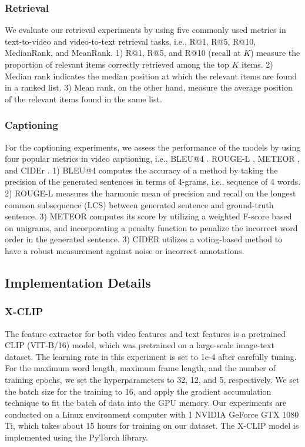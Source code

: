 \documentclass{article}
\begin{document}
\subsubsection{Retrieval}
We evaluate our retrieval experiments by using five commonly used metrics in text-to-video and video-to-text retrieval tasks, i.e., R@1, R@5, R@10, MedianRank, and MeanRank. 1) R@1, R@5, and R@10 (recall at $K$) measure the proportion of relevant items correctly retrieved among the top $K$ items. 2) Median rank indicates the median position at which the relevant items are found in a ranked list. 3) Mean rank, on the other hand, measure the average position of the relevant items found in the same list.

\subsubsection{Captioning}
For the captioning experiments, we assess the performance of the models by using four popular metrics in video captioning, i.e., BLEU@4 \cite{10.3115/1073083.1073135}. ROUGE-L \cite{lin2004rouge}, METEOR \cite{banarjee2005}, and CIDEr \cite{7299087}. 1) BLEU@4 computes the accuracy of a method by taking the precision of the generated sentences in terms of 4-grams, i.e., sequence of 4 words. 2) ROUGE-L measures the harmonic mean of precision and recall on the longest common subsequence (LCS) between generated sentence and ground-truth sentence.  3) METEOR computes its score by utilizing a weighted F-score based on unigrams, and incorporating a penalty function to penalize the incorrect word order in the generated sentence. 3) CIDER utilizes a voting-based method to have a robust measurement against noise or incorrect annotations.


\subsection{Implementation Details}
\subsubsection{X-CLIP}
The feature extractor for both video features and text features is a pretrained CLIP (VIT-B/16) \cite{Radford2021LearningTV} model, which was pretrained on a large-scale image-text dataset. The learning rate in this experiment is set to 1e-4 after carefully tuning. For the maximum word length, maximum frame length, and the number of training epochs, we set the hyperparameters to 32, 12, and 5, respectively. We set the batch size for the training to 16, and apply the gradient accumulation technique to fit the batch of data into the GPU memory. Our experiments are conducted on a Linux environment computer with 1 NVIDIA GeForce GTX 1080 Ti, which takes about 15 hours for training on our dataset. The X-CLIP model is implemented using the PyTorch library.
\end{document}
